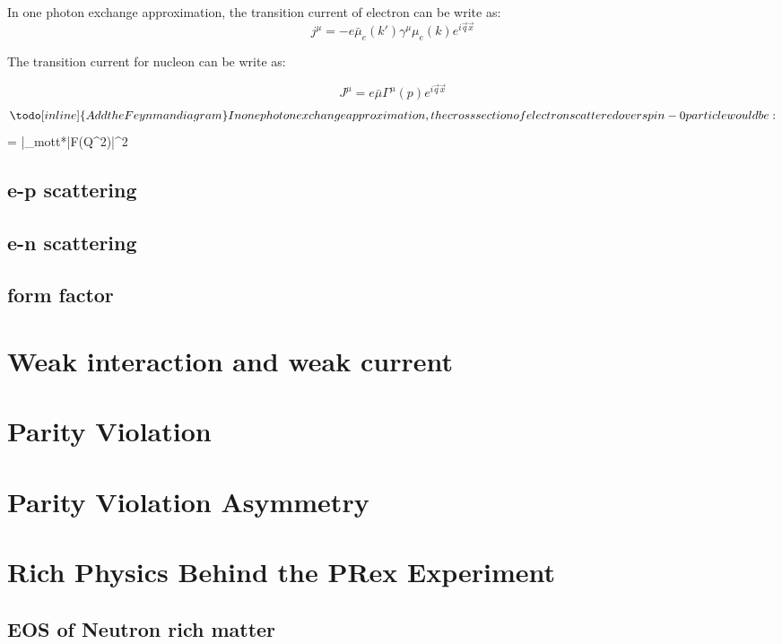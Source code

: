 In one photon exchange approximation, the transition current of electron can be write as:
$$
j^\mu = - e\bar{\mu}_e(k')\gamma^\mu\mu_e(k)e^{i\vec{q}\vec{x}}
$$

The  transition current for nucleon can be write as:

$$
J^\mu = e\bar{\mu}\Gamma^\mu(p)e^{i\vec{q}\vec{x}}$$
$$

\todo[inline]{Add the Feynman diagram}

In one photon exchange approximation, the cross section of electron scattered over spin-0 particle would be:

$$
 = |_{mott}*|F(Q^2)|^2
$$


\subsection{e-p scattering}
\subsection{e-n scattering}
\subsection{form factor}

\section{Weak interaction and weak current}
\section{Parity Violation}
\section{Parity Violation Asymmetry}
\section{Rich Physics Behind the PRex Experiment}
\subsection{EOS of Neutron rich matter}